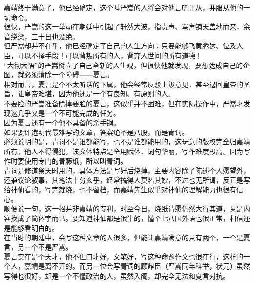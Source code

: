 \begin{multicols}{\theparacolNo}
嘉靖终于满意了，他已经确定，这个叫严嵩的人将会对他言听计从，并服从他的一切命令。\\

很快，严嵩的这一举动在朝廷中引起了轩然大波，指责声、骂声铺天盖地而来，余音绕梁，三十日也没绝。\\

但严嵩却并不在乎，他已经确定了自己的人生方向：只要能够飞黄腾达、位及人臣，可以不择手段！可以背叛所有的人，背弃人世间的所有道德！\\

“大彻大悟”的严嵩树立了自己全新的人生观，但很快他就发现，要想达成自己的企图，就必须清除一个障碍——夏言。\\

相对而言，夏言是个不太听话的下属，他会经常反驳上级意见，甚至退回皇帝的圣旨，让皇帝难堪，因为他还是一个有良知、有原则的人。\\

不要脸的严嵩准备除掉要脸的夏言，这似乎并不困难，但在实际操作中，严嵩才发现这几乎又是一个不可能完成的任务。\\

因为夏言还有一个他不具备的杀手锏。\\

如果要评选明代最难写的文章，答案绝不是八股，而是青词。\\

必须说明的是，青词不是谁都能写，也不是谁都能用的，这玩意的版权完全归嘉靖所有，他人不得侵犯，该文体特点是全用赋体、词句华丽，写作难度极高。因为写作时要使用专门的青藤纸，所以叫青词。\\

青词是修道祭天时用的，具体方法是写好后烧掉，主要内容除了陈述个人愿望外，还兼议论叙事，其笔法十分玄乎，经常搞得人莫名其妙，不过也无所谓，反正是写给神仙看的，写完就烧，也不留档，而嘉靖先生似乎对神仙的理解能力也很有信心。\\

顺便说一句，这一招并非嘉靖的专利，时至今日，烧纸请愿仍然大行其道，只是内容换成了简体字而已。要知道神仙都是很牛的，懂个七八国外语也很正常，相信还是能够看明白的。\\

在当时的朝廷中，会写这种文章的人很多，但能让嘉靖满意的只有两个，一个是夏言，另一个不是严嵩。\\

夏言实在是个天才，他不但口才好，文笔好，写这种命题作文也很在行，这样的一个人，嘉靖是离不开的。而另一位会写青词的顾鼎臣（严嵩同年科举，状元）虽然写得也很好，却是一个不懂政治的人，虽然入阁，却完全无法和夏言对抗。\\


\end{multicols}
